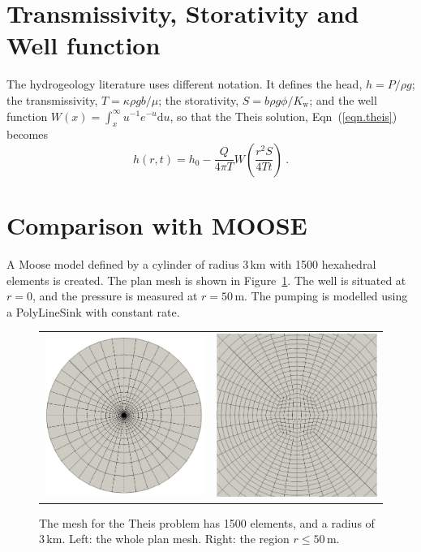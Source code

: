 \documentclass[]{scrreprt}
\begin{document}
\section{Transmissivity, Storativity and Well function}

The hydrogeology literature uses different notation.  It defines the
head, $h=P/\rho g$; the transmissivity, $T = \kappa\rho g b/\mu$; the
storativity, $S = b\rho 
g \phi/K_{\mathrm{w}}$; and the well function $W(x) =
\int_{x}^{\infty}u^{-1}e^{-u}\mathrm{d}u$, so that the Theis solution,
Eqn~(\ref{eqn.theis}) becomes
\begin{equation}
h(r,t) = h_{0} - \frac{Q}{4\pi T} W
\left(\frac{r^{2}S}{4Tt} \right) \ .
\end{equation}

\section{Comparison with MOOSE}

A Moose model defined by a cylinder of radius 3\,km with 1500
hexahedral elements is created.  The plan mesh is shown in
Figure~\ref{th.mesh.fig}.  The well is situated at $r=0$, and the
pressure is measured at $r=50$\,m.  The pumping is modelled using a
PolyLineSink with constant rate.

\begin{figure}[htb]
\begin{center}
\begin{tabular}{cc}
\includegraphics[width=6cm]{th_mesh.eps} &
\includegraphics[width=6cm]{th_mesh_zoom.eps}
\end{tabular}
\caption{The mesh for the Theis problem has 1500 elements, and a
  radius of 3\,km.  Left: the whole plan mesh.  Right: the region
  $r\leq 50$\,m.}
\label{th.mesh.fig}
\end{center}
\end{figure}
\end{document}

